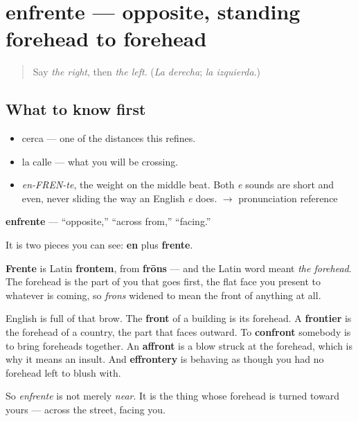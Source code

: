 \section[enfrente]{enfrente — opposite, standing forehead to forehead}

\label{lesson:ES-C340-enfrente}



\begin{quote}
Say \emph{the right}, then \emph{the left}. (\emph{La derecha}; \emph{la izquierda}.)
\end{quote}

\subsection*{What to know first}
\begin{itemize}
\raggedright
  \item cerca — one of the distances this refines.
  \item la calle — what you will be crossing.
\end{itemize}

\begin{sounds}
\begin{itemize}
\raggedright
  \item \emph{en-FREN-te}, the weight on the middle beat. Both \emph{e} sounds are short and even, never sliding the way an English \emph{e} does. $\to$ pronunciation reference
\end{itemize}
\end{sounds}

\begin{cousinweb}
\textbf{enfrente} — \textquotedblleft{}opposite,\textquotedblright{} \textquotedblleft{}across from,\textquotedblright{} \textquotedblleft{}facing.\textquotedblright{}

It is two pieces you can see: \textbf{en} plus \textbf{frente}.

\textbf{Frente} is Latin \textbf{frontem}, from \textbf{frōns} — and the Latin word meant \emph{the forehead}. The forehead is the part of you that goes first, the flat face you present to whatever is coming, so \emph{frons} widened to mean the front of anything at all.

English is full of that brow. The \textbf{front} of a building is its forehead. A \textbf{frontier} is the forehead of a country, the part that faces outward. To \textbf{confront} somebody is to bring foreheads together. An \textbf{affront} is a blow struck at the forehead, which is why it means an insult. And \textbf{effrontery} is behaving as though you had no forehead left to blush with.

So \emph{enfrente} is not merely \emph{near}. It is the thing whose forehead is turned toward yours — across the street, facing you.
\end{cousinweb}

